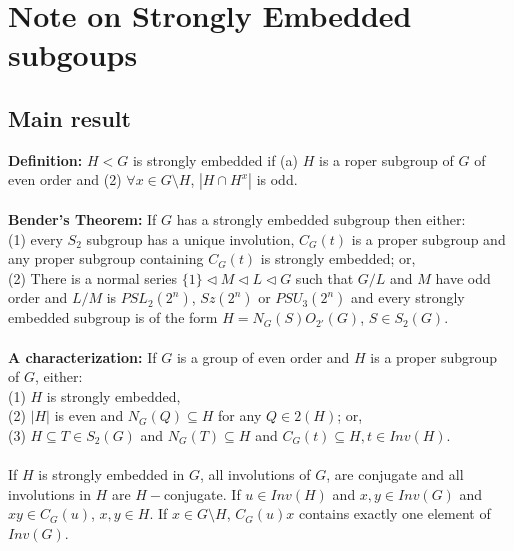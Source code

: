 \chapter{Note on Strongly Embedded subgoups}
\section {Main result} 
{\bf Definition:} $H<G$ is strongly embedded if (a) $H$  is a roper subgroup of $G$ of even order and
(2) $\forall x \in G \setminus H$, $|H \cap H^x|$ is odd.
\\
\\
{\bf Bender's Theorem:} If $G$ has a strongly embedded subgroup then either:
\\
(1) every $S_2$ subgroup has a unique involution, $C_G(t)$ is a proper subgroup and any
proper subgroup containing $C_G(t)$ is strongly embedded; or,
\\
(2) There is a normal series $\{1\} \lhd M \lhd L \lhd G$ such that $G/L$ and $M$ have odd order and
$L/M$ is $PSL_2(2^n)$, $Sz(2^n)$ or $PSU_3(2^n)$ and every strongly embedded subgroup is of the form
$H = N_G(S)O_{2'}(G)$, $S \in S_2(G)$.
\\
\\
{\bf A characterization:}  If $G$ is a group of even order and $H$ is a proper subgroup of $G$, either:
\\
(1) $H$ is strongly embedded,
\\
(2) $|H|$ is even and $N_G(Q) \subseteq H$ for any $Q \in 2(H)$; or,
\\
(3) $H \subseteq T \in S_2(G)$ and $N_G(T) \subseteq H$ and $C_G(t) \subseteq H, t \in Inv(H)$.
\\
\\
If $H$ is strongly embedded in $G$, all involutions of $G$, are conjugate and all involutions in $H$
are $H-$conjugate.  If $u \in Inv(H)$ and $x,y \in Inv(G)$ and $xy \in C_G(u)$, $x,y \in H$.  If
$x \in G \setminus H$,  $C_G(u)x$ contains exactly one element of $Inv(G)$.



